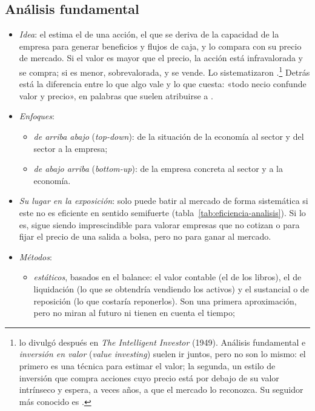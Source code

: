 \documentclass[11pt]{article}
\begin{document}
\subsection{Análisis fundamental}\label{sec:fundamental}

\begin{itemize}
\item \emph{Idea}: el  estima el  de una acción, el que se deriva de la capacidad de la empresa para generar beneficios y flujos de caja, y lo compara con su precio de mercado. Si el valor es mayor que el precio, la acción está infravalorada y se compra; si es menor, sobrevalorada, y se vende. Lo sistematizaron \textcite{GrahamDodd1934Security}.\footnote{ lo divulgó después en \emph{The Intelligent Investor} (1949). Análisis fundamental e \emph{inversión en valor} (\emph{value investing}) suelen ir juntos, pero no son lo mismo: el primero es una técnica para estimar el valor; la segunda, un estilo de inversión que compra acciones cuyo precio está por debajo de su valor intrínseco y espera, a veces años, a que el mercado lo reconozca. Su seguidor más conocido es .} Detrás está la diferencia entre lo que algo vale y lo que cuesta: «todo necio confunde valor y precio», en palabras que suelen atribuirse a .
\item \emph{Enfoques}:
  \begin{itemize}
  \item \emph{de arriba abajo} (\emph{top-down}): de la situación de la economía al sector y del sector a la empresa;
  \item \emph{de abajo arriba} (\emph{bottom-up}): de la empresa concreta al sector y a la economía.
  \end{itemize}
\item \emph{Su lugar en la exposición}: solo puede batir al mercado de forma sistemática si este no es eficiente en sentido semifuerte (tabla~\ref{tab:eficiencia-analisis}). Si lo es, sigue siendo imprescindible para valorar empresas que no cotizan o para fijar el precio de una salida a bolsa, pero no para ganar al mercado.
\item \emph{Métodos}\nocite{Mascarenas2026Monografias}:
  \begin{itemize}
  \item \emph{estáticos}, basados en el balance: el valor contable (el de los libros), el de liquidación (lo que se obtendría vendiendo los activos) y el sustancial o de reposición (lo que costaría reponerlos). Son una primera aproximación, pero no miran al futuro ni tienen en cuenta el tiempo;

\end{itemize}
\end{itemize}
\end{document}
